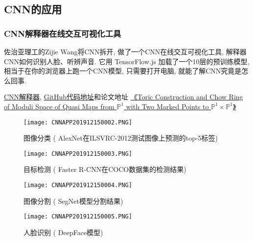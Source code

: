 \subsection{CNN的应用}
\subsubsection{CNN解释器在线交互可视化工具}
佐治亚理工的Zijie Wang将CNN拆开, 做了一个CNN在线交互可视化工具,  解释器CNN如何识别人脸、听辨声音.
它用 TensorFlow.js 加载了一个10层的预训练模型, 相当于在你的浏览器上跑一个CNN模型, 只需要打开电脑, 就能了解CNN究竟是怎么回事.

\href{https://poloclub.github.io/cnn-explainer/}{CNN解释器}, \href{https://github.com/poloclub/cnn-explainer}{GitHub代码地址}和论文地址
\href{https://arxiv.org/abs/2004.1500}{《Toric Construction and Chow Ring of Moduli Space of Quasi Maps from $\mathbb P^1$ with Two Marked Points to $\mathbb P^1\times \mathbb P^1$》}
\begin{figure}[H]
    \centering
    \texttt{[image: CNNAPP201912150002.PNG]}
    \caption{图像分类 ( AlexNet在ILSVRC-2012测试图像上预测的top-5标签)}
    \label{CNNAPP201912150002}
    \vspace{-0.4cm}
\end{figure}
\begin{figure}[H]
    \centering
    \texttt{[image: CNNAPP201912150003.PNG]}
    \caption{目标检测 ( Faster R-CNN在COCO数据集的检测结果)}
    \label{CNNAPP201912150003}
    \vspace{-0.4cm}
\end{figure}
\begin{figure}[H]
    \centering
    \texttt{[image: CNNAPP201912150004.PNG]}
    \caption{图像分割 ( SegNet模型分割结果)}
    \label{CNNAPP201912150004}
    \vspace{-0.4cm}
\end{figure}
\begin{figure}[H]
    \centering
    \texttt{[image: CNNAPP201912150005.PNG]}
    \caption{人脸识别 ( DeepFace模型)}
    \label{CNNAPP201912150005}
    \vspace{-0.4cm}
\end{figure}
